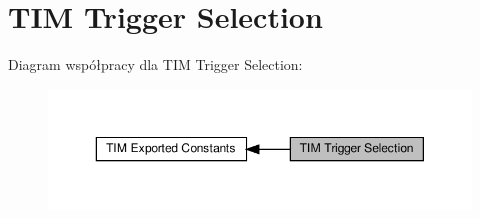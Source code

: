 \hypertarget{group___t_i_m___trigger___selection}{}\section{T\+IM Trigger Selection}
\label{group___t_i_m___trigger___selection}
Diagram współpracy dla T\+IM Trigger Selection\+:\nopagebreak
\begin{figure}[H]
\begin{center}
\leavevmode
\includegraphics[width=350pt]{group___t_i_m___trigger___selection}
\end{center}
\end{figure}
